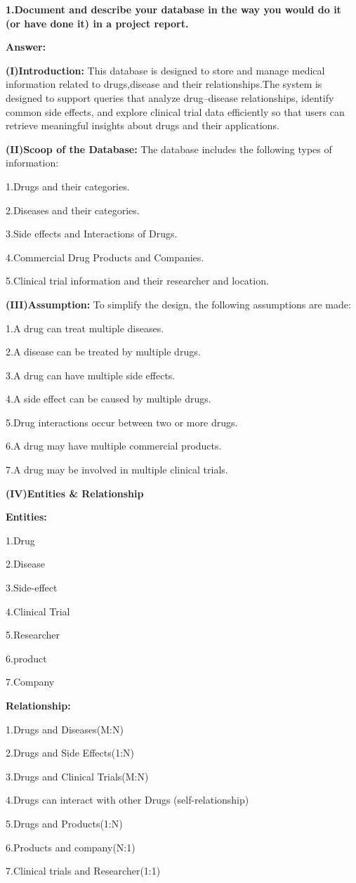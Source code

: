 \documentclass[15pt,a4paper]{article}
\begin{document}
\textbf{1.Document and describe your database in the way you would do it (or have done it) in a project report.}\par 


\textbf{Answer:}\par
\textbf{(I)Introduction:}
This database is designed to store and manage medical information related to drugs,disease and their relationships.The system is designed to support queries that analyze drug–disease relationships, identify common side effects, and explore clinical trial data efficiently so that users can retrieve meaningful insights about drugs and their applications.\par
\textbf{(II)Scoop of the Database:}
The database includes the following types of information:\par
1.Drugs and their categories.\par
2.Diseases and their categories.\par
3.Side effects and Interactions of Drugs.\par
4.Commercial Drug Products and Companies.\par
5.Clinical trial information and their researcher and location.\par
\textbf{(III)Assumption:}
To simplify the design, the following assumptions are made:\par
1.A drug can treat multiple diseases.\par
2.A disease can be treated by multiple drugs.\par
3.A drug can have multiple side effects.\par
4.A side effect can be caused by multiple drugs.\par
5.Drug interactions occur between two or more drugs.\par
6.A drug may have multiple commercial products.\par
7.A drug may be involved in multiple clinical trials.\par
\textbf{(IV)Entities \& Relationship}\par
\textbf{Entities:}\par
1.Drug\par
2.Disease\par
3.Side-effect\par
4.Clinical Trial\par
5.Researcher\par
6.product\par
7.Company\par
\textbf{Relationship:}\par
1.Drugs and Diseases(M:N)\par
2.Drugs and Side Effects(1:N)\par
3.Drugs and Clinical Trials(M:N)\par
4.Drugs can interact with other Drugs (self-relationship)\par
5.Drugs and Products(1:N)\par
6.Products and company(N:1)\par
7.Clinical trials and Researcher(1:1)\par
\end{document}

